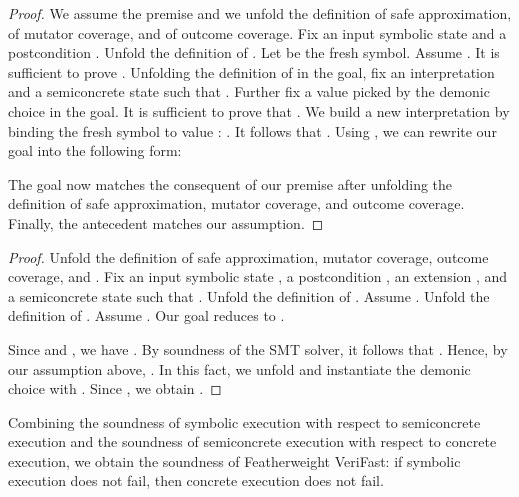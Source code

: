 \documentclass{CSML}
\newcommand{\sv}{\hat{v}}
\newcommand{\display}[1]{}
\theoremstyle{definition}\newtheorem{notation}[thm]{Notation}
\theoremstyle{plain}\newtheorem{satz}[thm]{Satz}
\begin{document}
\begin{lem}[Soundness of ]
\display{C({-}) \rightsquigarrow_I C'({-}) \Rightarrow \sv \leftarrow \mathsf{fresh}; C(\sv) \rightsquigarrow_I \bigotimes v.\;C'(v)}
\end{lem}
\begin{proof}
We assume the premise and we 
unfold the definition of safe approximation, of mutator coverage, and of 
outcome coverage. Fix an input symbolic state  and a 
postcondition . Unfold the definition of . Let 
 be the fresh symbol. Assume . It is 
sufficient to prove . Unfolding the definition of  in the goal, fix 
an interpretation  and a semiconcrete state  such 
that . Further fix a value  picked by 
the demonic choice in the goal. It is sufficient to prove that . We build a new interpretation  by 
binding the fresh symbol  to value : . It follows that . Using , we can rewrite our goal 
into the following form: 

The goal now matches the consequent of our premise  after unfolding the definition of safe 
approximation, mutator coverage, and outcome coverage. Finally, the 
antecedent matches our assumption. 
\end{proof}

\begin{lem}[Soundness of ]
\display{\mathsf{sassume}(b) \rightsquigarrow_I \mathsf{assume}(b)}
\end{lem}
\begin{proof}
Unfold the definition of safe 
approximation, mutator coverage, outcome coverage, and . Fix an 
input symbolic state , a postcondition , an extension 
, and a semiconcrete state  such that . Unfold the definition of . Assume 
. Unfold the definition of . 
Assume . Our goal reduces to 
. 

Since  and , we have 
. By soundness of the 
SMT solver, it follows that . Hence, by our assumption above, . 
In this fact, we unfold  and instantiate the demonic choice with 
. Since , we obtain .
\end{proof}

\begin{thm}
\emph{}
\end{thm}\medskip

\noindent Combining the soundness of symbolic execution with respect to semiconcrete execution and the
soundness of semiconcrete execution with respect to concrete execution, we obtain the soundness of
Featherweight VeriFast: if symbolic execution does not fail, then concrete execution does not fail.
\end{document}

